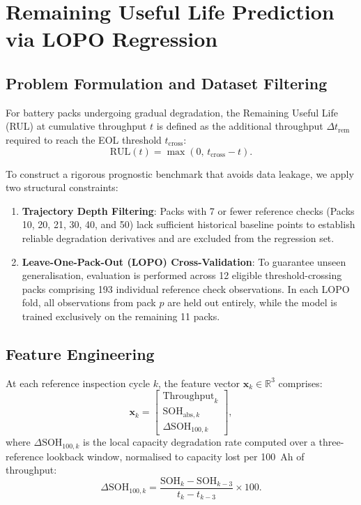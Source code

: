 \section{Remaining Useful Life Prediction via LOPO Regression}

\subsection{Problem Formulation and Dataset Filtering}

For battery packs undergoing gradual degradation, the Remaining Useful Life
(RUL) at cumulative throughput $t$ is defined as the additional throughput
$\Delta t_{\mathrm{rem}}$ required to reach the EOL threshold
$t_{\mathrm{cross}}$:
\begin{equation}
  \mathrm{RUL}(t) = \max\left(0,\, t_{\mathrm{cross}} - t\right).
\end{equation}

To construct a rigorous prognostic benchmark that avoids data leakage,
we apply two structural constraints:
\begin{enumerate}
  \item \textbf{Trajectory Depth Filtering}: Packs with 7 or fewer reference
  checks (Packs 10, 20, 21, 30, 40, and 50) lack
  sufficient historical baseline points to establish reliable degradation
  derivatives and are excluded from the regression set.
  \item \textbf{Leave-One-Pack-Out (LOPO) Cross-Validation}: To guarantee
  unseen generalisation, evaluation is performed across 12 eligible
  threshold-crossing packs comprising 193 individual reference check
  observations. In each LOPO fold, all observations from pack $p$ are held
  out entirely, while the model is trained exclusively on the remaining
  11 packs.
\end{enumerate}

\subsection{Feature Engineering}

At each reference inspection cycle $k$, the feature vector
$\mathbf{x}_k \in \mathbb{R}^3$ comprises:
\begin{equation}
  \mathbf{x}_k = \begin{bmatrix}
    \mathrm{Throughput}_k \\
    \mathrm{SOH}_{\mathrm{abs}, k} \\
    \Delta\mathrm{SOH}_{100, k}
  \end{bmatrix},
\end{equation}
where $\Delta\mathrm{SOH}_{100, k}$ is the local capacity degradation rate
computed over a three-reference lookback window, normalised to capacity
lost per \SI{100}{Ah} of throughput:
\begin{equation}
  \Delta\mathrm{SOH}_{100, k} = \frac{\mathrm{SOH}_k - \mathrm{SOH}_{k-3}}
  {t_k - t_{k-3}} \times 100.
\end{equation}


